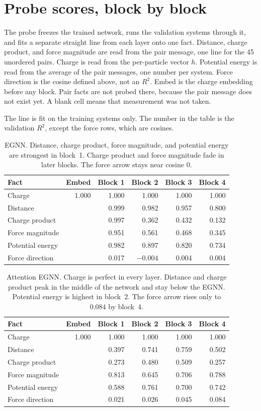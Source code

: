 \documentclass[11pt]{article}
\newcommand{\probehdr}{%
  \toprule
  Fact & Embed & Block 1 & Block 2 & Block 3 & Block 4 \\
  \midrule
}
\begin{document}
\section{Probe scores, block by block}

The probe freezes the trained network, runs the validation systems through it, and fits a separate straight line from each layer onto one fact.
Distance, charge product, and force magnitude are read from the pair message, one line for the 45 unordered pairs.
Charge is read from the per-particle vector $h$.
Potential energy is read from the average of the pair messages, one number per system.
Force direction is the cosine defined above, not an $R^2$.
Embed is the charge embedding before any block.
Pair facts are not probed there, because the pair message does not exist yet.
A blank cell means that measurement was not taken.

The line is fit on the training systems only.
The number in the table is the validation $R^2$, except the force rows, which are cosines.

\begin{table}[ht]
\centering
\caption{EGNN.
Distance, charge product, force magnitude, and potential energy are strongest in block~1.
Charge product and force magnitude fade in later blocks.
The force arrow stays near cosine $0$.}
\label{tab:egnn}
\begin{tabular}{lrrrrr}
\probehdr
Charge & 1.000 & 1.000 & 1.000 & 1.000 & 1.000 \\
Distance & & 0.999 & 0.982 & 0.957 & 0.800 \\
Charge product & & 0.997 & 0.362 & 0.432 & 0.132 \\
Force magnitude & & 0.951 & 0.561 & 0.468 & 0.345 \\
Potential energy & & 0.982 & 0.897 & 0.820 & 0.734 \\
Force direction & & 0.017 & $-0.004$ & 0.004 & 0.004 \\
\bottomrule
\end{tabular}
\end{table}

\begin{table}[ht]
\centering
\caption{Attention EGNN.
Charge is perfect in every layer.
Distance and charge product peak in the middle of the network and stay below the EGNN.
Potential energy is highest in block~2.
The force arrow rises only to $0.084$ by block~4.}
\label{tab:attn}
\begin{tabular}{lrrrrr}
\probehdr
Charge & 1.000 & 1.000 & 1.000 & 1.000 & 1.000 \\
Distance & & 0.397 & 0.741 & 0.759 & 0.502 \\
Charge product & & 0.273 & 0.480 & 0.509 & 0.257 \\
Force magnitude & & 0.813 & 0.645 & 0.706 & 0.788 \\
Potential energy & & 0.588 & 0.761 & 0.700 & 0.742 \\
Force direction & & 0.021 & 0.026 & 0.045 & 0.084 \\
\bottomrule
\end{tabular}
\end{table}
\end{document}
